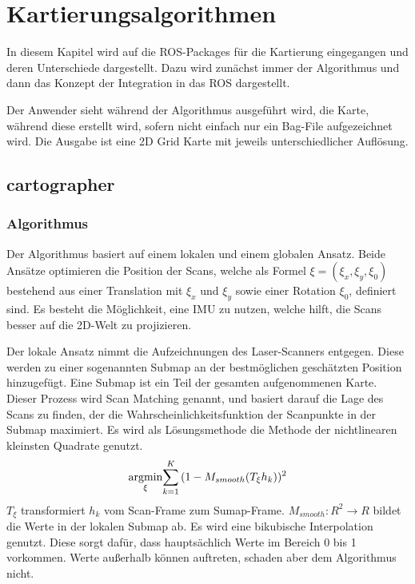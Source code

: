 \chapter{Kartierungsalgorithmen} \label{Kap3}

In diesem Kapitel wird auf die \ac{ROS}-Packages für die Kartierung eingegangen und deren Unterschiede dargestellt. Dazu wird zunächst immer der Algorithmus und dann das Konzept der Integration in das  \acl{ROS} dargestellt.

Der Anwender sieht während der Algorithmus ausgeführt wird, die Karte, während diese erstellt wird, sofern nicht einfach nur ein Bag-File aufgezeichnet wird. Die Ausgabe ist eine 2D Grid Karte mit jeweils unterschiedlicher Auflösung.

\section{cartographer}

\subsection{Algorithmus}

Der Algorithmus basiert auf einem lokalen und einem globalen Ansatz. Beide Ansätze optimieren die Position der Scans, welche als Formel $ \xi = \left( \xi_{ x }, \xi_{ y }, \xi_{ 0 } \right) $ bestehend aus einer Translation mit $ \xi_{ x } $ und $ \xi_{ y } $ sowie einer Rotation $ \xi_{ 0 } $, definiert sind. Es besteht die Möglichkeit, eine \ac{IMU} zu nutzen, welche hilft, die Scans besser auf die 2D-Welt zu projizieren.

Der lokale Ansatz nimmt die Aufzeichnungen des Laser-Scanners entgegen. Diese werden zu einer sogenannten Submap an der bestmöglichen geschätzten Position hinzugefügt. Eine Submap ist ein Teil der gesamten aufgenommenen Karte. Dieser Prozess wird Scan Matching genannt, und basiert darauf die Lage des Scans zu finden, der die Wahrscheinlichkeitsfunktion der Scanpunkte in der Submap maximiert. Es wird als Lösungsmethode die Methode der nichtlinearen kleinsten Quadrate genutzt.
\begin{align}
    \underset{\xi}{\operatorname*{argmin} } { \sum_{k=1}^K {(1 - M_{smooth}(T_{\xi}h_{k}))^{ 2 }} }
\end{align}
$ T_{\xi} $ transformiert $ h_{k} $ vom Scan-Frame zum Sumap-Frame. $ M_{smooth}: R^2 \to R $ bildet die Werte in der lokalen Submap ab. Es wird eine bikubische Interpolation genutzt. Diese sorgt dafür, dass hauptsächlich Werte im Bereich 0 bis 1 vorkommen. Werte außerhalb können auftreten, schaden aber dem Algorithmus nicht.

